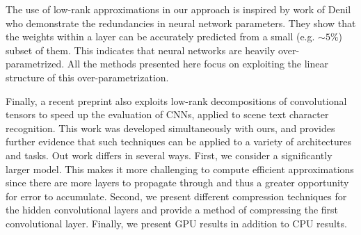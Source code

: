 The use of low-rank approximations in our approach is inspired by work
of Denil \etal \cite{denil2013predicting} who demonstrate the redundancies in neural
network parameters. They show that the weights within a layer can be
accurately predicted from a small (e.g. $\sim 5\%$) subset of them. This
indicates that neural networks are heavily over-parametrized.  All the
methods presented here focus on exploiting the linear structure of this
over-parametrization.

Finally, a recent preprint \cite{zisserman14} also exploits low-rank decompositions
of convolutional tensors to speed up the evaluation of CNNs, applied to scene text character
recognition. This work was developed simultaneously with ours, and provides 
further evidence that such techniques can be applied to a variety of architectures 
and tasks. 
Out work differs in several ways. 
First, we consider a significantly larger model. 
This makes it more challenging to compute efficient approximations since there are more layers to propagate through and thus a greater opportunity for error to accumulate. 
Second, we present different compression techniques for the hidden convolutional layers and provide a method of compressing the first convolutional layer. 
Finally, we present GPU results in addition to CPU results. 

